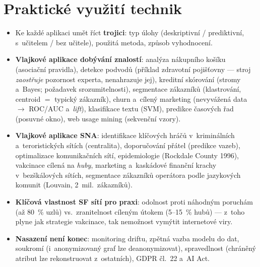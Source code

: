 \documentclass[11pt,a4paper]{article}
\theoremstyle{definition}
\begin{document}
\section{Praktické využití technik}
\begin{itemize}
\item Ke každé aplikaci umět říct \textbf{trojici}: typ úlohy (deskriptivní / prediktivní,
 s~učitelem / bez učitele), použitá metoda, způsob vyhodnocení.
\item \textbf{Vlajkové aplikace dobývání znalostí}: analýza nákupního košíku (asociační
 pravidla), detekce podvodů (příklad zdravotní pojišťovny --- stroj \emph{zaostřuje}
 pozornost experta, nenahrazuje jej), kreditní skórování (stromy a~Bayes; požadavek
 srozumitelnosti), segmentace zákazníků (klastrování, centroid $=$ typický zákazník),
 churn a~cílený marketing (nevyvážená data $\to$ ROC/AUC a~\emph{lift}), klasifikace textu
 (SVM), predikce časových řad (posuvné okno), web usage mining (sekvenční vzory).
\item \textbf{Vlajkové aplikace SNA}: identifikace klíčových hráčů v~kriminálních
 a~teroristických sítích (centralita), doporučování přátel (predikce vazeb), optimalizace
 komunikačních sítí, epidemiologie (Rockdale County 1996), vakcinace cílená na \emph{huby},
 marketing a~kaskádové finanční krachy v~bezškálových sítích, segmentace zákazníků
 operátora podle jazykových komunit (Louvain, 2~mil.\ zákazníků).
\item \textbf{Klíčová vlastnost SF sítí pro praxi}: odolnost proti náhodným poruchám (až 80~\%
 uzlů) vs.\ zranitelnost cíleným útokem (5--15~\% hubů) --- z~toho plyne jak strategie
 vakcinace, tak nemožnost vymýtit internetové viry.
\item \textbf{Nasazení není konec}: monitoring driftu, zpětná vazba modelu do dat, soukromí
 (i~anonymizovaný graf lze deanonymizovat), spravedlnost (chráněný atribut lze
 rekonstruovat z~ostatních), GDPR čl.~22 a~AI Act.
\end{itemize}
\end{document}
